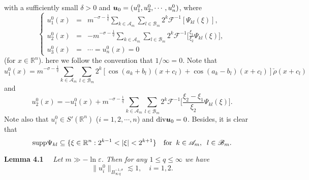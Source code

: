 \documentclass[11pt]{article}
\newcommand{\supp}{{\rm supp}}
\newcommand{\diva}{{\rm div}}
\newcommand{\bfu}{{\mbox{\boldmath $u$}}}
\begin{document}
  with a sufficiently small $\delta>0$ and $\bfu_0=(u_1^0,u_2^0,\cdots,u_n^0)$, where
\begin{equation}
\left\{
\begin{array}{rcl}
  u_1^0(x)&=&\displaystyle m^{-\sigma-\frac{1}{q}}\sum_{k\in\mathscr{A}_m}\sum_{l\in\mathscr{B}_m}2^k\mathscr{F}^{-1}[\Psi_{kl}(\xi)],
\\ [0.3cm]
  u_2^0(x)&=&\displaystyle -m^{-\sigma-\frac{1}{q}}\sum_{k\in\mathscr{A}_m}\sum_{l\in\mathscr{B}_m}
  2^k\mathscr{F}^{-1}\Big[\frac{\xi_1}{\xi_2}\Psi_{kl}(\xi)\Big],
\\ [0.3cm]
  u_3^0(x)&=&\cdots=u_n^0(x)=0
\end{array}
\right.
\end{equation}
  (for $x\in\mathbb{R}^n$). here we follow the convention that $1/\infty=0$. Note that
$$
  u_1^0(x)= m^{-\sigma-\frac{1}{q}}\sum_{k\in\mathscr{A}_m}\sum_{l\in\mathscr{B}_m}2^k[\cos(a_k+b_l)(x+c_l)+\cos(a_k-b_l)(x+c_l)]
  \check{\rho}(x+c_l)
$$
  and
$$
  u_2^0(x)=-u_1^0(x)+m^{-\sigma-\frac{1}{q}}\sum_{k\in\mathscr{A}_m}\sum_{l\in\mathscr{B}_m}
  2^k\mathscr{F}^{-1}\Big[\frac{\xi_2-\xi_1}{\xi_2}\Psi_{kl}(\xi)\Big].
$$
 Note also that $u_i^0\in S'(\mathbb{R}^n)$ ($i=1,2,\cdots,n$) and $\diva\bfu_0=0$. Besides, it is clear that
\begin{equation}
  \supp\Psi_{kl}\subseteq \{\xi\in\mathbb{R}^n:2^{k-1}<|\xi|<2^{k+1}\} \quad \mbox{for}\;\; k\in\mathscr{A}_m, \;\; l\in\mathscr{B}_m.
\end{equation}

  {\bf Lemma 4.1} \ \ {\em Let $m\gg-\ln\varepsilon$. Then for any $1\leqslant q\leqslant\infty$ we have}
\begin{equation}
  \|u_i^0\|_{B^{-1,\sigma}_{\infty\,q}}\lesssim 1, \quad i=1,2.
\end{equation}
\end{document}
